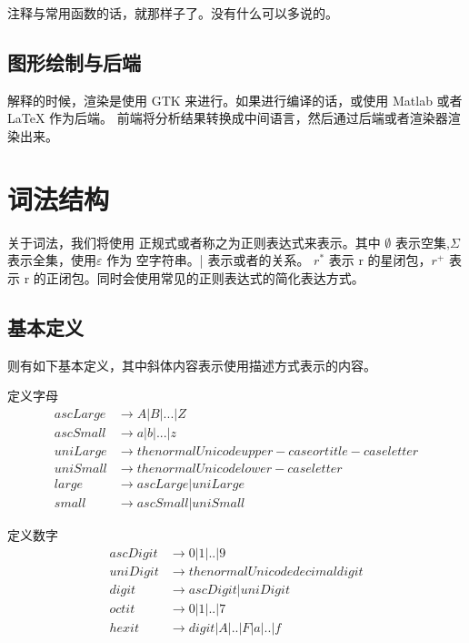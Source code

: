 \documentclass{ctexart}
\begin{document}
注释与常用函数的话，就那样子了。没有什么可以多说的。

\subsection{图形绘制与后端}
\label{sec:intro:drawNbackend}

解释的时候，渲染是使用 GTK 来进行。如果进行编译的话，或使用 Matlab 或者 LaTeX 作为后端。
前端将分析结果转换成中间语言，然后通过后端或者渲染器渲染出来。

\section{词法结构}
\label{sec:lexicalStructure}

关于词法，我们将使用 正规式或者称之为正则表达式来表示。其中 $\emptyset$ 表示空集,$\Sigma$表示全集，使用$\varepsilon$ 作为
空字符串。| 表示或者的关系。 $r^*$ 表示 r 的星闭包，$r^+$ 表示 r 的正闭包。同时会使用常见的正则表达式的简化表达方式。

\subsection{基本定义}
\label{sec:lexical:basic}

则有如下基本定义，其中斜体内容表示使用描述方式表示的内容。

定义字母
\begin{align*}
ascLarge &\rightarrow A|B|...|Z \\
ascSmall &\rightarrow a|b|...|z \\
uniLarge &\rightarrow \mathit{the normal Unicode upper-case or title-case letter} \\
uniSmall &\rightarrow \mathit{the normal Unicode lower-case letter} \\
large &\rightarrow ascLarge|uniLarge \\
small &\rightarrow ascSmall|uniSmall
\end{align*}

定义数字
\begin{align*}
ascDigit &\rightarrow 0|1|..|9 \\
uniDigit &\rightarrow \mathit{the normal Unicode decimal digit} \\
digit &\rightarrow ascDigit|uniDigit \\
octit &\rightarrow 0|1|..|7 \\
hexit &\rightarrow digit|A|..|F|a|..|f
\end{align*}
\end{document}
